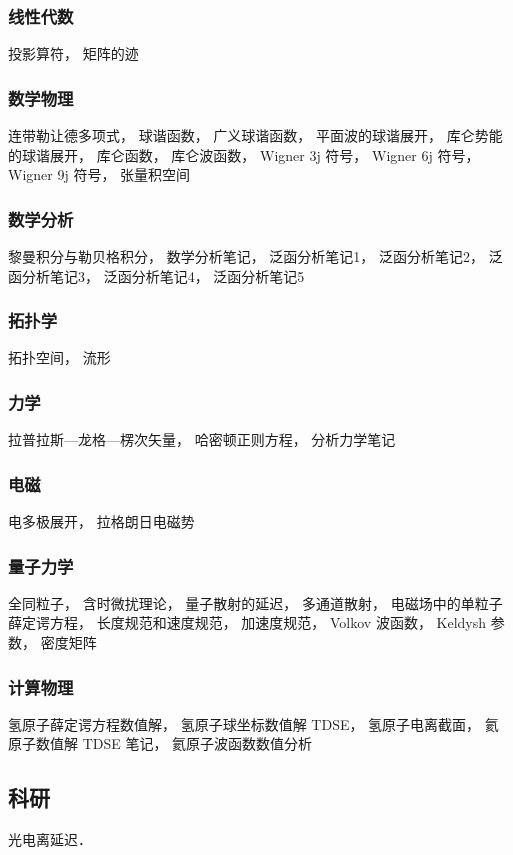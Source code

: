 
\subsubsection{线性代数}
投影算符， 矩阵的迹

\subsubsection{数学物理}
连带勒让德多项式， 球谐函数， 广义球谐函数， 平面波的球谐展开， 库仑势能的球谐展开， 库仑函数， 库仑波函数， Wigner 3j 符号， Wigner 6j 符号， Wigner 9j 符号， 张量积空间

\subsubsection{数学分析}
黎曼积分与勒贝格积分， 数学分析笔记， 泛函分析笔记1， 泛函分析笔记2， 泛函分析笔记3， 泛函分析笔记4， 泛函分析笔记5

\subsubsection{拓扑学}
拓扑空间， 流形

\subsubsection{力学}
拉普拉斯—龙格—楞次矢量， 哈密顿正则方程， 分析力学笔记

\subsubsection{电磁}
电多极展开， 拉格朗日电磁势

\subsubsection{量子力学}
全同粒子， 含时微扰理论， 量子散射的延迟， 多通道散射， 电磁场中的单粒子薛定谔方程， 长度规范和速度规范， 加速度规范， Volkov 波函数， Keldysh 参数， 密度矩阵

\subsubsection{计算物理}
氢原子薛定谔方程数值解， 氢原子球坐标数值解 TDSE， 氢原子电离截面， 氦原子数值解 TDSE 笔记， 氦原子波函数数值分析

\subsection{科研}
光电离延迟．

